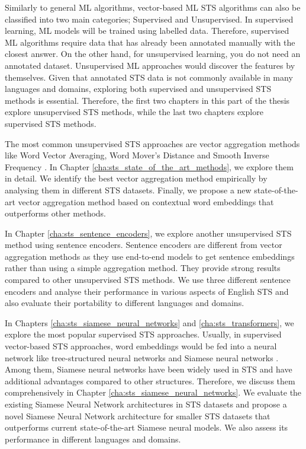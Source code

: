 Similarly to general ML algorithms, vector-based ML STS algorithms can also be classified into two main categories; Supervised and Unsupervised. In supervised learning, ML models will be trained using labelled data. Therefore, supervised ML algorithms require data that has already been annotated manually with the closest answer. On the other hand, for unsupervised learning, you do not need an annotated dataset. Unsupervised ML approaches would discover the features by themselves. Given that annotated STS data is not commonly available in many languages and domains, exploring both supervised and unsupervised STS methods is essential. Therefore, the first two chapters in this part of the thesis explore unsupervised STS methods, while the last two chapters explore supervised STS methods. 

The most common unsupervised STS approaches are vector aggregation methods like Word Vector Averaging, Word Mover's Distance \autocite{10.5555/3045118.3045221} and Smooth Inverse Frequency \autocite{DBLP:conf/iclr/AroraLM17}. In Chapter \ref{cha:sts_state_of_the_art_methods}, we explore them in detail. We identify the best vector aggregation method empirically by analysing them in different STS datasets. Finally, we propose a new state-of-the-art vector aggregation method based on contextual word embeddings that outperforms other methods. 

In Chapter \ref{cha:sts_sentence_encoders}, we explore another unsupervised STS method using sentence encoders. Sentence encoders are different from vector aggregation methods as they use end-to-end models to get sentence embeddings rather than using a simple aggregation method. They provide strong results compared to other unsupervised STS methods. We use three different sentence encoders and analyse their performance in various aspects of English STS and also evaluate their portability to different languages and domains. 


In Chapters \ref{cha:sts_siamese_neural_networks} and \ref{cha:sts_transformers}, we explore the most popular supervised STS approaches. Usually, in supervised vector-based STS approaches, word embeddings would be fed into a neural network like tree-structured neural networks \autocite{tai-etal-2015-improved} and Siamese neural networks \autocite{Mueller_Thyagarajan_2016}. Among them, Siamese neural networks have been widely used in STS and have additional advantages compared to other structures. Therefore, we discuss them comprehensively in Chapter \ref{cha:sts_siamese_neural_networks}. We evaluate the existing Siamese Neural Network architectures in STS datasets and propose a novel Siamese Neural Network architecture for smaller STS datasets that outperforms current state-of-the-art Siamese neural models.  We also assess its performance in different languages and domains.

